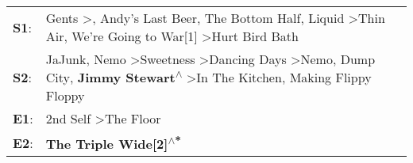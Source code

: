 \begin{supertabular}{p{0.03\textwidth}p{0.92\textwidth}}
 \textbf{S1}:  &                                                              Gents\textsuperscript{} \textgreater {}\textsuperscript{}, \enspace Andy's Last Beer\textsuperscript{}, \enspace The Bottom Half\textsuperscript{}, \enspace Liquid\textsuperscript{} \textgreater \enspace Thin Air\textsuperscript{}, \enspace We're Going to War[1]\textsuperscript{} \textgreater \enspace Hurt Bird Bath\textsuperscript{}  \enspace  \\
 \textbf{S2}:  &  JaJunk\textsuperscript{}, \enspace Nemo\textsuperscript{} \textgreater \enspace Sweetness\textsuperscript{} \textgreater \enspace Dancing Days\textsuperscript{} \textgreater \enspace Nemo\textsuperscript{}, \enspace Dump City\textsuperscript{}, \enspace \textbf{Jimmy Stewart\textsuperscript{$\wedge$}} \textgreater \enspace In The Kitchen\textsuperscript{}, \enspace Making Flippy Floppy\textsuperscript{}  \enspace  \\
 \textbf{E1}:  &                                                                                                                                                                                                                                                                                                                                            2nd Self\textsuperscript{} \textgreater \enspace The Floor\textsuperscript{}  \enspace  \\
 \textbf{E2}:  &                                                                                                                                                                                                                                                                                                                                                                  \textbf{The Triple Wide[2]\textsuperscript{$\wedge$*}}  \enspace  \\
\end{supertabular}
